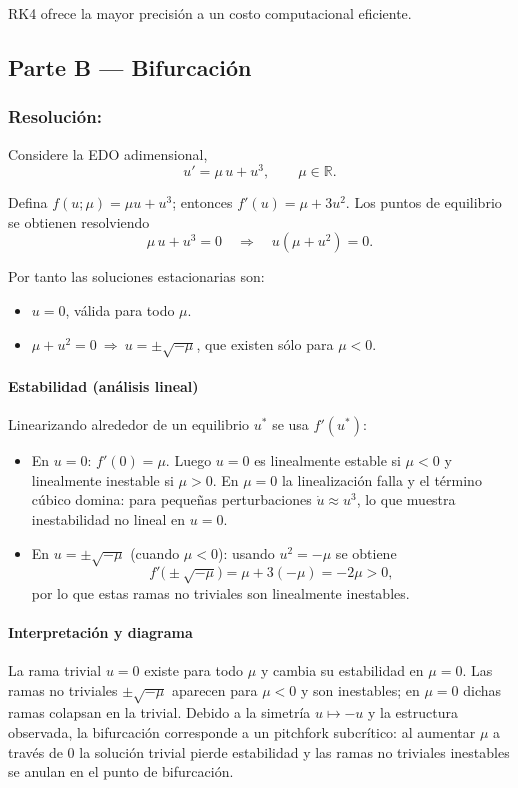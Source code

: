 \documentclass[a4paper,10pt]{article}
\begin{document}
RK4 ofrece la mayor precisión a un costo computacional eficiente.

 
\subsection{Parte B --- Bifurcación}\label{sub:parteB}
\medskip
\subsubsection{Resolución:} 
Considere la EDO adimensional,
\begin{equation}\label{eq:bif}
	u' = \mu\,u + u^{3},\qquad \mu\in\mathbb{R}.
\end{equation}

Defina $f(u;\mu)=\mu u + u^{3}$; entonces $f'(u)=\mu + 3u^{2}$. Los puntos de equilibrio se obtienen resolviendo
\begin{equation}
	\mu\,u + u^{3} = 0 \quad\Longrightarrow\quad u(\mu + u^{2})=0.
\end{equation}

Por tanto las soluciones estacionarias son:
\begin{itemize}
	\item $u=0$, válida para todo $\mu$.
	\item $\mu + u^{2}=0\ \Rightarrow\ u=\pm\sqrt{-\mu}$, que existen sólo para $\mu<0$.
\end{itemize}

\paragraph{Estabilidad (análisis lineal)}
Linearizando alrededor de un equilibrio $u^*$ se usa $f'(u^* )$:
\begin{itemize}
	\item En $u=0$: $f'(0)=\mu$. Luego $u=0$ es linealmente estable si $\mu<0$ y linealmente inestable si $\mu>0$. En $\mu=0$ la linealización falla y el término cúbico domina: para pequeñas perturbaciones $\dot u\approx u^{3}$, lo que muestra inestabilidad no lineal en $u=0$.
	\item En $u=\pm\sqrt{-\mu}$ (cuando $\mu<0$): usando $u^{2}=-\mu$ se obtiene
	\[f'\big(\pm\sqrt{-\mu}\big)=\mu+3(-\mu)=-2\mu>0,\]
	por lo que estas ramas no triviales son linealmente inestables.
\end{itemize}

\paragraph{Interpretación y diagrama}
La rama trivial $u=0$ existe para todo $\mu$ y cambia su estabilidad en $\mu=0$. Las ramas no triviales $\pm\sqrt{-\mu}$ aparecen para $\mu<0$ y son inestables; en $\mu=0$ dichas ramas colapsan en la trivial. Debido a la simetría $u\mapsto -u$ y la estructura observada, la bifurcación corresponde a un pitchfork subcrítico: al aumentar $\mu$ a través de $0$ la solución trivial pierde estabilidad y las ramas no triviales inestables se anulan en el punto de bifurcación.
\end{document}
